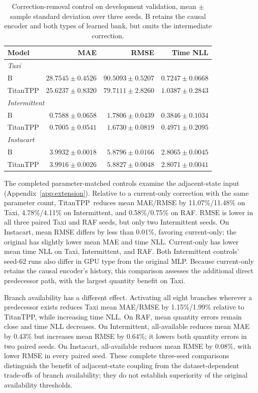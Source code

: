 \documentclass[runningheads]{llncs}
\newcommand{\method}{TitanTPP}
\begin{document}
\begin{table}[t]
\caption{Correction-removal control on development validation, mean $\pm$ sample standard deviation
over three seeds. B retains the causal encoder and both types of learned
bank, but omits the intermediate correction.}
\label{tab:ablation}\centering\small
\begin{tabular}{lrrr}
\toprule
Model & MAE & RMSE & Time NLL\\
\midrule
\multicolumn{4}{l}{\textit{Taxi}}\\
B & $28.7545\pm0.4526$ & $90.5093\pm0.5207$ & $0.7247\pm0.0668$\\
TitanTPP & $25.6237\pm0.8320$ & $79.7111\pm2.8260$ & $1.0387\pm0.2843$\\
\midrule
\multicolumn{4}{l}{\textit{Intermittent}}\\
B & $0.7588\pm0.0658$ & $1.7806\pm0.0439$ & $0.3846\pm0.1034$\\
TitanTPP & $0.7005\pm0.0541$ & $1.6730\pm0.0819$ & $0.4971\pm0.2095$\\
\midrule
\multicolumn{4}{l}{\textit{Instacart}}\\
B & $3.9932\pm0.0018$ & $5.8796\pm0.0166$ & $2.8065\pm0.0045$\\
TitanTPP & $3.9916\pm0.0026$ & $5.8827\pm0.0048$ & $2.8071\pm0.0041$\\
\bottomrule
\end{tabular}
\end{table}

The completed parameter-matched controls examine the adjacent-state input
(Appendix~\ref{app:extension}). Relative to a current-only correction with
the same parameter count, \method\ reduces mean MAE/RMSE by
11.07\%/11.48\% on Taxi, 4.78\%/4.11\% on Intermittent, and
0.58\%/0.75\% on RAF. RMSE is lower in all three paired Taxi and RAF
seeds, but only two Intermittent seeds. On Instacart, mean RMSE differs by
less than 0.01\%, favoring current-only; the original has slightly lower
mean MAE and time NLL. Current-only has lower mean time NLL on Taxi,
Intermittent, and RAF. Both Intermittent controls' seed-62 runs also differ
in GPU type from the original MLP. Because current-only retains the causal
encoder's history, this comparison assesses the additional direct predecessor
path, with the largest quantity benefit on Taxi.

Branch availability has a different effect. Activating all eight branches
wherever a predecessor exists reduces Taxi mean MAE/RMSE by 1.15\%/1.99\%
relative to \method, while increasing time NLL. On RAF, mean quantity
errors remain close and time NLL decreases. On Intermittent, all-available
reduces mean MAE by 0.43\% but increases mean RMSE by 0.64\%; it lowers
both quantity errors in two paired seeds. On Instacart, all-available reduces
mean RMSE by 0.08\%, with lower RMSE in every paired seed. These complete
three-seed comparisons distinguish the benefit of adjacent-state coupling
from the dataset-dependent trade-offs of branch availability; they do not
establish superiority of the original availability thresholds.
\end{document}
